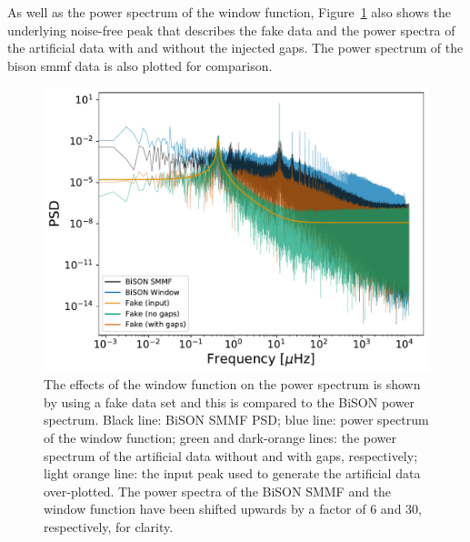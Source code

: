 As well as the power spectrum of the window function, Figure~\ref{fig:window_function_PSDs} also shows the underlying noise-free peak that describes the fake data and the power spectra of the artificial data with and without the injected gaps. The power spectrum of the \gls{bison} \gls{smmf} data is also plotted for comparison.

\begin{figure}[ht!]
	\centering
	\includegraphics[width=\columnwidth]{gap_test.pdf}
	\caption{The effects of the window function on the power spectrum is shown by using a fake data set and this is compared to the BiSON power spectrum. Black line: BiSON SMMF PSD; blue line: power spectrum of the window function; green and dark-orange lines: the power spectrum of the artificial data without and with gaps, respectively; light orange line: the input peak used to generate the artificial data over-plotted. The power spectra of the BiSON SMMF and the window function have been shifted upwards by a factor of 6 and 30, respectively, for clarity.}
	\label{fig:window_function_PSDs}
\end{figure}


